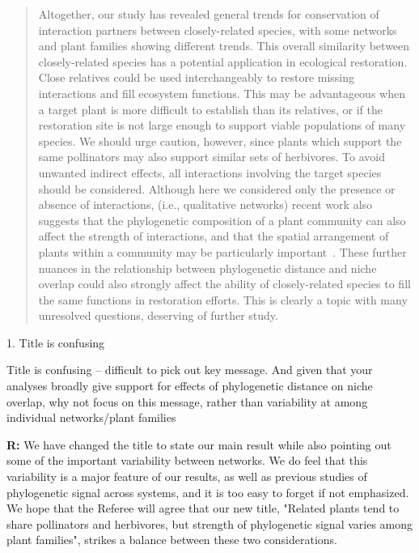 \documentclass[12pt]{letter}
\newenvironment{refquote}{\bigskip \begin{it}}{\end{it}\smallskip}
\begin{document}
	\begin{quotation}

		Altogether, our study has revealed general trends for conservation of interaction
		partners between closely-related species, with some networks and plant 
		families showing different trends. This overall similarity between closely-related
		species has a potential application in ecological restoration. Close relatives could
		be used interchangeably to restore missing interactions and fill ecosystem functions. 
		This may be advantageous when a target plant is more difficult to establish than its
		relatives, or if the restoration site is not large enough to support viable populations 
		of many species. We should urge caution, however, since plants which support the
		same pollinators may also support similar sets of herbivores. To avoid unwanted 
		indirect effects, all interactions involving the target species should be considered.
		Although here we considered only the presence or absence of interactions,
		(i.e., qualitative networks)
		recent work also suggests that the phylogenetic composition of a plant
		community can also affect the strength of 
		interactions, and that the spatial arrangement of plants within a 
		community may be particularly important~\citep{Yguel2011,Castagneyrol2014}.
		These further nuances in the relationship between phylogenetic distance and 
		niche overlap could also strongly affect the ability of closely-related species to
		fill the same functions in restoration efforts. This is clearly a topic with many
		unresolved questions, deserving of further study.

	\end{quotation}


	1. Title is confusing

		\begin{refquote}
			Title is confusing – difficult to pick out key message. And given that your analyses broadly give support for effects of phylogenetic distance on niche overlap, why not focus on this message, rather than variability at among individual networks/plant families
		\end{refquote}


		\textbf{R:} We have changed the title to state our main result while also pointing out some of the important variability between networks. We do feel that this variability is a major feature of our results, as well as previous studies of phylogenetic signal across systems, and it is too easy to forget if not emphasized. We hope that the Referee will agree that our new title, "Related plants tend to share pollinators and herbivores, but strength of phylogenetic signal varies among plant families", strikes a balance between these two considerations.
\end{document}
